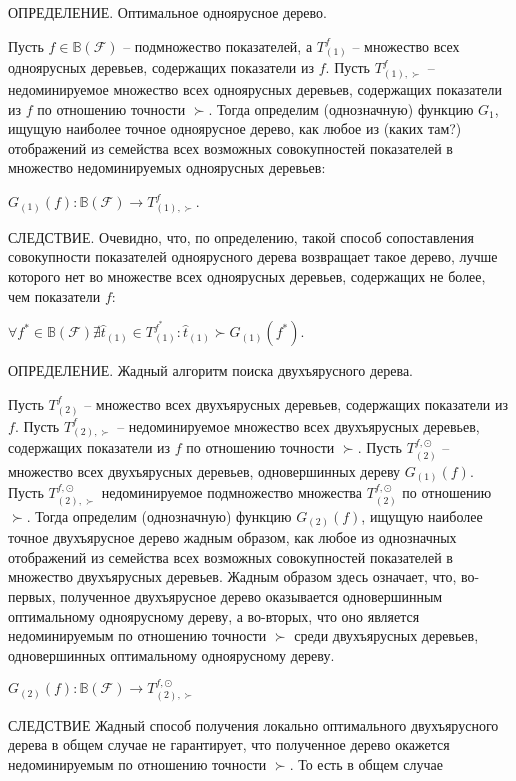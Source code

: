 \documentclass[12pt]{a&t}
\begin{document}
ОПРЕДЕЛЕНИЕ. Оптимальное одноярусное дерево.

Пусть $f \in \mathbb{B}(\mathscr{F})$ -- подмножество показателей, а $T_{(1)}^f$ -- множество всех одноярусных деревьев, содержащих показатели из $f$. Пусть $T_{(1), \succ}^f$ -- недоминируемое множество всех одноярусных деревьев, содержащих показатели из $f$ по отношению точности $\succ$. Тогда определим (однозначную) функцию $G_1$, ищущую наиболее точное одноярусное дерево, как любое из (каких там?) отображений из семейства всех возможных совокупностей показателей в множество недоминируемых одноярусных деревьев: 

$G_{(1)}(f): \mathbb{B}(\mathscr{F})  \rightarrow T_{(1), \succ}^f$.

СЛЕДСТВИЕ. Очевидно, что, по определению, такой способ сопоставления совокупности показателей одноярусного дерева возвращает такое дерево, лучше которого нет во множестве всех одноярусных деревьев, содержащих не более, чем показатели $f$:

$\forall f^* \in \mathbb{B}(\mathscr{F}) \nexists \hat{t}_{(1)} \in T_{(1)}^{f^*}: \hat{t}_{(1)} \succ G_{(1)}(f^*) $.

ОПРЕДЕЛЕНИЕ. Жадный алгоритм поиска двухъярусного дерева.

Пусть $T_{(2)}^f$ -- множество всех двухъярусных деревьев, содержащих показатели из $f$. Пусть $T_{(2), \succ}^f$ -- недоминируемое множество всех двухъярусных деревьев, содержащих показатели из $f$ по отношению точности $\succ$. Пусть $T^{f, \odot}_{(2)}$ -- множество всех двухъярусных деревьев, одновершинных дереву $G_{(1)}(f)$. Пусть $T^{f, \odot}_{(2), \succ}$ недоминируемое подмножество множества $T^{f, \odot}_{(2)}$ по отношению $\succ$. Тогда определим (однозначную) функцию $G_{(2)}(f)$, ищущую наиболее точное двухъярусное дерево жадным образом, как любое из однозначных отображений из семейства всех возможных совокупностей показателей в множество  двухъярусных деревьев. Жадным образом здесь означает, что, во-первых, полученное двухъярусное дерево оказывается одновершинным оптимальному одноярусному дереву, а во-вторых, что оно является недоминируемым по отношению точности $\succ$ среди двухъярусных деревьев, одновершинных оптимальному одноярусному дереву.  

$G_{(2)}(f): \mathbb{B}(\mathscr{F})  \rightarrow T^{f, \odot}_{(2), \succ}$

СЛЕДСТВИЕ
Жадный способ получения  локально оптимального двухъярусного дерева в общем случае не гарантирует, что полученное дерево окажется недоминируемым по отношению точности $\succ$. То есть в общем случае
\end{document}
